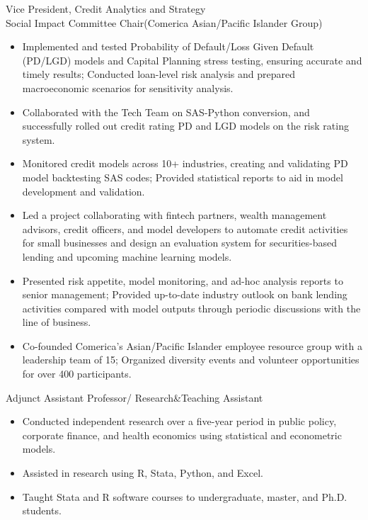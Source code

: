 \documentclass{resume}
\begin{document}
Vice President, Credit Analytics and Strategy\\
Social Impact Committee Chair(Comerica Asian/Pacific Islander Group)
\begin{itemize}
\item Implemented and tested Probability of Default/Loss Given Default (PD/LGD) models and Capital Planning stress testing, ensuring accurate and timely results; Conducted loan-level risk analysis and prepared macroeconomic scenarios for sensitivity analysis.
\item Collaborated with the Tech Team on SAS-Python conversion, and successfully rolled out credit rating PD and LGD models on the risk rating system.
\item Monitored credit models across 10+ industries, creating and validating PD model backtesting SAS codes; Provided statistical reports to aid in model development and validation.
\item Led a project collaborating with fintech partners, wealth management advisors, credit officers, and model developers to automate credit activities for small businesses and design an evaluation system for securities-based lending and upcoming machine learning models.
\item Presented risk appetite, model monitoring, and ad-hoc analysis reports to senior management; Provided up-to-date industry outlook on bank lending activities compared with model outputs through periodic discussions with the line of business.
\item Co-founded Comerica's Asian/Pacific Islander employee resource group with a leadership team of 15; Organized diversity events and volunteer opportunities for over 400 participants.
\end{itemize}

Adjunct Assistant Professor/ Research\&Teaching Assistant
\begin{itemize}
\item Conducted independent research over a five-year period in public policy, corporate finance, and health economics using statistical and econometric models.
\item Assisted in research using R, Stata, Python, and Excel.
\item Taught Stata and R software courses to undergraduate, master, and Ph.D. students.
\end{itemize}
\end{document}

